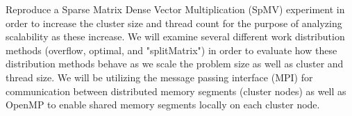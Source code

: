 Reproduce a Sparse Matrix Dense Vector Multiplication (SpMV) experiment in order to increase the cluster size and thread count for the purpose of analyzing scalability as these increase. We will examine several different work distribution methods (overflow, optimal, and "splitMatrix") in order to evaluate how these distribution methods behave as we scale the problem size as well as cluster and thread size. We will be utilizing the message passing interface (MPI) for communication between distributed memory segments (cluster nodes) as well as OpenMP to enable shared memory segments locally on each cluster node.